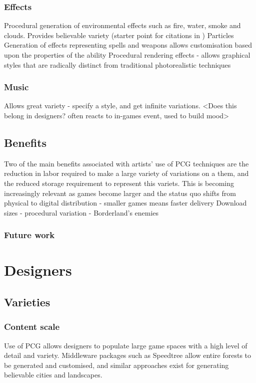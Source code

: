 \documentclass{acm_proc_article-sp}
\begin{document}
\subsubsection{Effects}
Procedural generation of environmental effects such as fire, water, smoke and clouds. Provides believable variety (starter point for citations in \cite{hendrikx2012procedural})
Particles
Generation of effects representing spells and weapons allows customisation based upon the properties of the ability \cite{particles}
Procedural rendering effects - allows graphical styles that are radically distinct from traditional photorealistic techniques \cite{kowalski1999art}
\subsubsection{Music}
Allows great variety - specify a style, and get infinite variations. \cite{collins2009introduction} <Does this belong in designers? often reacts to in-games event, used to build mood>

\subsection{Benefits}
Two of the main benefits associated with artists' use of PCG techniques are the reduction in labor required to make a large variety of variations on a them, and the reduced storage requirement to represent this variets. This is becoming increasingly relevant as games become larger and the status quo shifts from physical to digital distribution - smaller games means faster delivery
Download sizes - procedural variation - Borderland's enemies
\subsubsection{Future work}

\section{Designers}

\subsection{Varieties}
\subsubsection{Content scale}
Use of PCG allows designers to populate large game spaces with a high level of detail and variety. Middleware packages such as Speedtree\cite{speedtree} allow entire forests to be generated and customised, and similar approaches exist for generating believable cities and landscapes.
\end{document}
